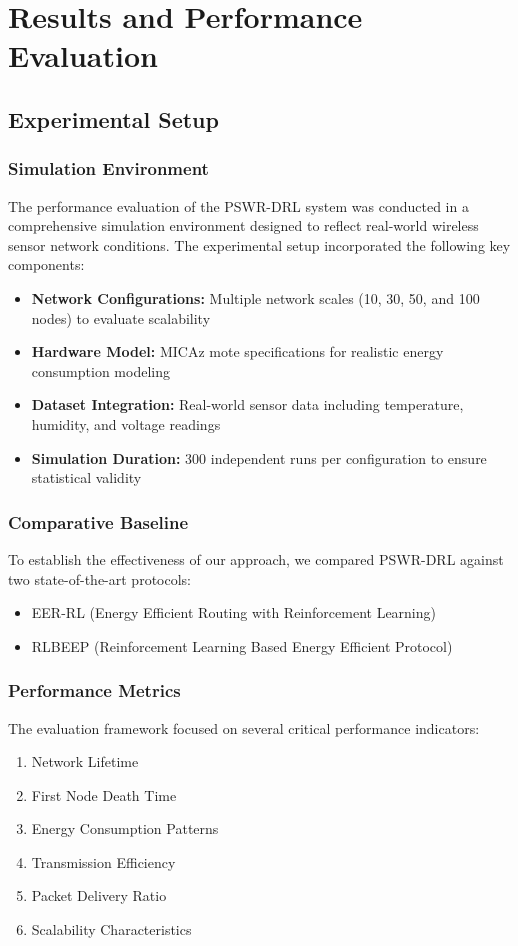 \chapter{Results and Performance Evaluation}
\label{ch:results}

\section{Experimental Setup}
\subsection{Simulation Environment}
The performance evaluation of the PSWR-DRL system was conducted in a comprehensive simulation environment designed to reflect real-world wireless sensor network conditions. The experimental setup incorporated the following key components:

\begin{itemize}
\item \textbf{Network Configurations:} Multiple network scales (10, 30, 50, and 100 nodes) to evaluate scalability
\item \textbf{Hardware Model:} MICAz mote specifications for realistic energy consumption modeling
\item \textbf{Dataset Integration:} Real-world sensor data including temperature, humidity, and voltage readings
\item \textbf{Simulation Duration:} 300 independent runs per configuration to ensure statistical validity
\end{itemize}

\subsection{Comparative Baseline}
To establish the effectiveness of our approach, we compared PSWR-DRL against two state-of-the-art protocols:
\begin{itemize}
\item EER-RL (Energy Efficient Routing with Reinforcement Learning)
\item RLBEEP (Reinforcement Learning Based Energy Efficient Protocol)
\end{itemize}

\subsection{Performance Metrics}
The evaluation framework focused on several critical performance indicators:
\begin{enumerate}
\item Network Lifetime
\item First Node Death Time
\item Energy Consumption Patterns
\item Transmission Efficiency
\item Packet Delivery Ratio
\item Scalability Characteristics
\end{enumerate}

